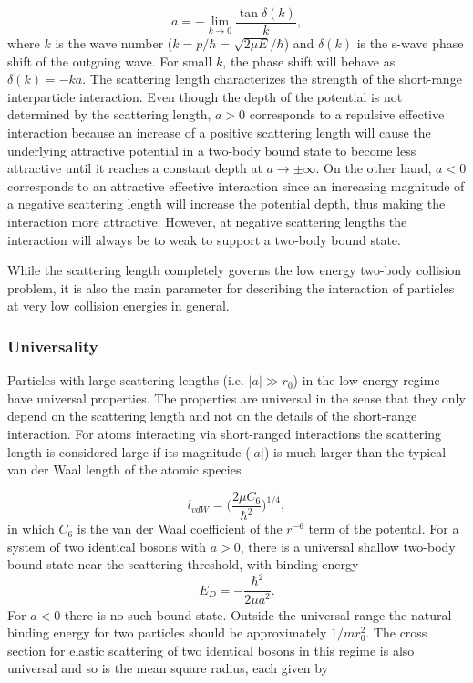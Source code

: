 \documentclass{article}
\providecommand{\abs}[1]{\lvert#1\rvert} \providecommand{\norm}[1]{\lVert#1\rVert}
\begin{document}
\begin{equation} \label{eq:2}
a = -\lim_{k \to 0} \frac{\tan \delta(k)}{k},
\end{equation}
where $k$ is the wave number ($k=p/\hbar = \sqrt{2\mu E}/\hbar$) and $\delta(k)$ is the s-wave phase shift of the outgoing wave. For small $k$, the phase shift will behave as $\delta(k)=-ka$. 
The scattering length characterizes the strength of the short-range interparticle interaction. Even though the depth of the potential is not determined by the scattering length, $a>0$  corresponds to a repulsive effective interaction because an increase of a positive scattering length will cause the underlying attractive potential in a two-body bound state to become less attractive until it reaches a constant depth at $a\to \pm \infty$. On the other hand, $a<0$ corresponds to an attractive effective interaction since an increasing magnitude of a negative scattering length will increase the potential depth, thus making the interaction more attractive. However, at negative scattering lengths the interaction will always be to weak to support a two-body bound state. \cite{Kajsa_my}

While the scattering length completely governs the low energy two-body collision problem, it is also the main parameter for describing the interaction of particles at very low collision energies in general. 

\subsubsection{Universality}
Particles with large scattering lengths (i.e. $\abs{a}\gg r_0$) in the low-energy regime have universal properties. The properties are universal in the sense that they only depend on the scattering length and not on the details of the short-range interaction. For atoms interacting via short-ranged interactions the scattering length is considered large if its magnitude ($\abs{a}$) is much larger than the typical van der Waal length of the atomic species

\begin{equation}
l_{vdW} = \bigg(\frac{2\mu C_6}{\hbar^2}\bigg)^{1/4},
\end{equation}
in which $C_6$ is the van der Waal coefficient of the $r^{-6}$ term of the potental. For a system of two identical bosons with $a>0$, there is a universal shallow two-body bound state near the scattering threshold, with binding energy 
\begin{equation}\label{shallowdimer}
E_D = -\frac{\hbar^2}{2 \mu a^2}.
\end{equation}
For $a<0$ there is no such bound state. Outside the universal range the natural binding energy for two particles should be approximately $1/mr_0^2$. The cross section for elastic scattering of two identical bosons in this regime is also universal and so is the mean square radius, each given by
\end{document}
